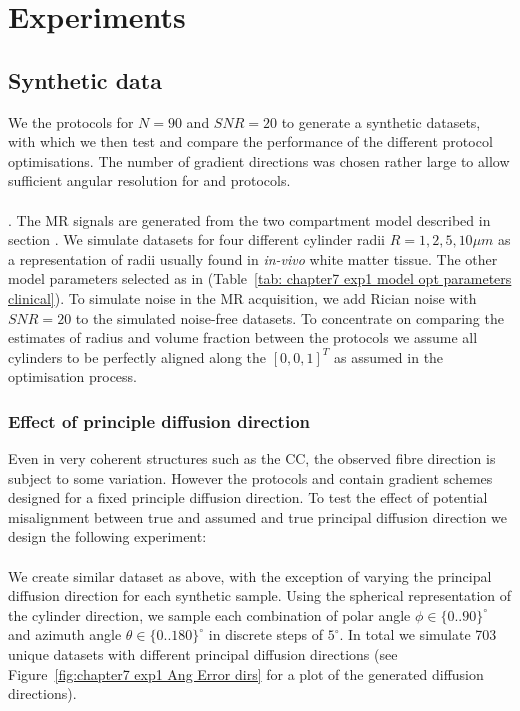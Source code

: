 \section{Experiments}
\subsection{Synthetic data}
We the protocols for $N=90$ and $SNR=20$ to generate a synthetic datasets, with which we then test and compare the performance of the different protocol optimisations. The number of gradient directions was chosen rather large to allow sufficient angular resolution for {\OI} and {\DO} protocols.
\paragraph{}
\label{sec: chapter 6 fibre distribution perfect}.
 The MR signals are generated from the two compartment model described in section  . We simulate datasets for four different cylinder radii $R={1,2,5,10}\mu m$ as a representation of radii usually found in \emph{in-vivo} white matter tissue. The other model parameters selected as in (Table~\ref{tab: chapter7 exp1 model opt parameters clinical}). To simulate noise in the MR acquisition, we add Rician noise with $SNR=20$ to the simulated noise-free datasets. To concentrate on comparing the estimates of radius and volume fraction between the protocols we assume all cylinders to be perfectly aligned along the $[0,0,1]^T$ as assumed in the optimisation process.

\subsubsection*{Effect of principle diffusion direction}
Even in very coherent structures such as the \gls{CC}, the observed fibre direction is subject to some variation. However the protocols {\FD} and {\DO} contain gradient schemes designed for a fixed principle diffusion direction. To test the effect of potential misalignment between true and assumed and true principal diffusion direction we design the following experiment:
\paragraph{}
We create similar dataset as above, with the exception of varying the principal diffusion direction for each synthetic sample. Using the spherical representation of the cylinder direction, we sample each combination of polar angle $\phi \in \{0..90\}^\circ$ and azimuth angle $\theta \in \{0..180\}^\circ$ in discrete steps of $5^\circ$. In total we simulate 703 unique datasets with different principal diffusion directions (see Figure~\ref{fig:chapter7 exp1 Ang Error dirs} for a plot of the generated diffusion directions).

